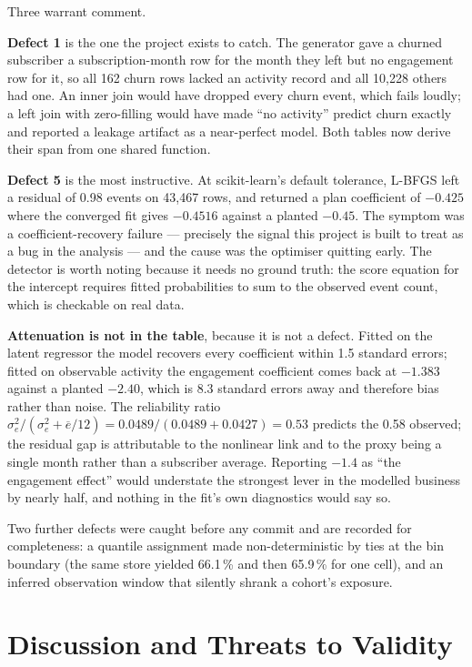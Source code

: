 \documentclass[conference]{IEEEtran}
\begin{document}
Three warrant comment.

\textbf{Defect 1} is the one the project exists to catch. The generator gave a
churned subscriber a subscription-month row for the month they left but no
engagement row for it, so all 162 churn rows lacked an activity record and all
10{,}228 others had one. An inner join would have dropped every churn event,
which fails loudly; a left join with zero-filling would have made ``no
activity'' predict churn exactly and reported a leakage artifact as a
near-perfect model. Both tables now derive their span from one shared function.

\textbf{Defect 5} is the most instructive. At scikit-learn's default tolerance,
L-BFGS left a residual of 0.98 events on 43{,}467 rows, and returned a plan
coefficient of $-0.425$ where the converged fit gives $-0.4516$ against a
planted $-0.45$. The symptom was a coefficient-recovery failure --- precisely
the signal this project is built to treat as a bug in the analysis --- and the
cause was the optimiser quitting early. The detector is worth noting because it
needs no ground truth: the score equation for the intercept requires fitted
probabilities to sum to the observed event count, which is checkable on real
data.

\textbf{Attenuation is not in the table}, because it is not a defect. Fitted on
the latent regressor the model recovers every coefficient within 1.5 standard
errors; fitted on observable activity the engagement coefficient comes back at
$-1.383$ against a planted $-2.40$, which is 8.3 standard errors away and
therefore bias rather than noise. The reliability ratio
$\sigma^2_e/(\sigma^2_e + \overline{e}/12) = 0.0489/(0.0489+0.0427) = 0.53$
predicts the 0.58 observed; the residual gap is attributable to the nonlinear
link and to the proxy being a single month rather than a subscriber average.
Reporting $-1.4$ as ``the engagement effect'' would understate the strongest
lever in the modelled business by nearly half, and nothing in the fit's own
diagnostics would say so.

Two further defects were caught before any commit and are recorded for
completeness: a quantile assignment made non-deterministic by ties at the bin
boundary (the same store yielded 66.1\,\% and then 65.9\,\% for one cell), and
an inferred observation window that silently shrank a cohort's exposure.

\section{Discussion and Threats to Validity}
\end{document}
